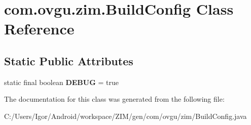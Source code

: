 \hypertarget{classcom_1_1ovgu_1_1zim_1_1_build_config}{\section{com.\-ovgu.\-zim.\-Build\-Config Class Reference}
\label{classcom_1_1ovgu_1_1zim_1_1_build_config}
}
\subsection*{Static Public Attributes}
\begin{DoxyCompactItemize}
\item 
\hypertarget{classcom_1_1ovgu_1_1zim_1_1_build_config_af24e7148bf08f4fddf4eb50a01de3c10}{static final boolean {\bfseries D\-E\-B\-U\-G} = true}\label{classcom_1_1ovgu_1_1zim_1_1_build_config_af24e7148bf08f4fddf4eb50a01de3c10}

\end{DoxyCompactItemize}


The documentation for this class was generated from the following file\-:\begin{DoxyCompactItemize}
\item 
C\-:/\-Users/\-Igor/\-Android/workspace/\-Z\-I\-M/gen/com/ovgu/zim/Build\-Config.\-java\end{DoxyCompactItemize}
